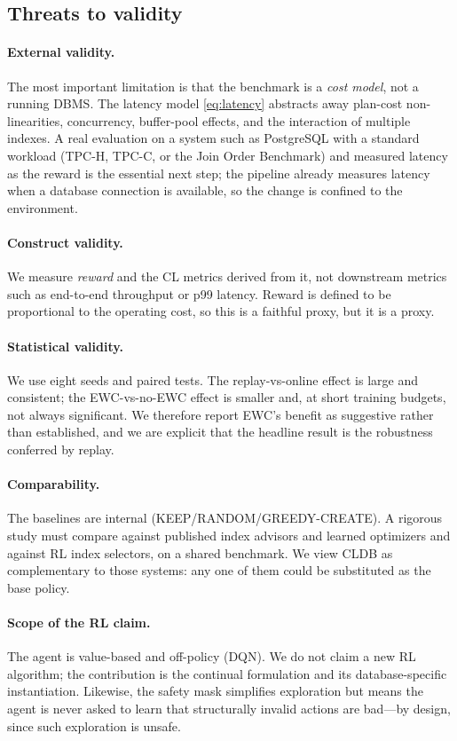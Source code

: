 \subsection{Threats to validity}
\label{sec:threats}
\paragraph{External validity.}
The most important limitation is that the benchmark is a \emph{cost model}, not a
running DBMS. The latency model \eqref{eq:latency} abstracts away plan-cost
non-linearities, concurrency, buffer-pool effects, and the interaction of
multiple indexes. A real evaluation on a system such as PostgreSQL with a
standard workload (TPC-H, TPC-C, or the Join Order Benchmark) and measured
latency as the reward is the essential next step; the pipeline already measures
latency when a database connection is available, so the change is confined to the
environment.

\paragraph{Construct validity.}
We measure \emph{reward} and the CL metrics derived from it, not downstream
metrics such as end-to-end throughput or p99 latency. Reward is defined to be
proportional to the operating cost, so this is a faithful proxy, but it is a
proxy.

\paragraph{Statistical validity.}
We use eight seeds and paired tests. The replay-vs-online effect is large and
consistent; the EWC-vs-no-EWC effect is smaller and, at short training budgets,
not always significant. We therefore report EWC's benefit as suggestive rather
than established, and we are explicit that the headline result is the robustness
conferred by replay.

\paragraph{Comparability.}
The baselines are internal (KEEP/RANDOM/GREEDY-CREATE). A rigorous study must
compare against published index advisors and learned optimizers
\citep{chaudhuri1997autoadmin,valentin2000db2advisor,marcus2021bao} and against
RL index selectors, on a shared benchmark. We view CLDB as complementary to those
systems: any one of them could be substituted as the base policy.

\paragraph{Scope of the RL claim.}
The agent is value-based and off-policy (DQN). We do not claim a new RL
algorithm; the contribution is the continual formulation and its
database-specific instantiation. Likewise, the safety mask simplifies
exploration but means the agent is never asked to learn that structurally invalid
actions are bad---by design, since such exploration is unsafe.
